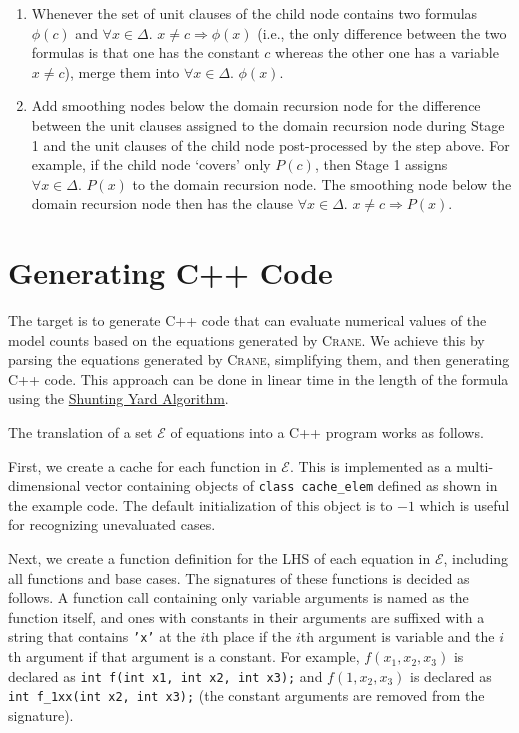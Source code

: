 \documentclass{article}
\theoremstyle{definition}
\begin{document}
\begin{enumerate}
  \item Whenever the set of unit clauses of the child node contains two formulas
        $\phi(c)$ and $\forall x \in \Delta\text{.
        } x \ne c \Rightarrow \phi(x)$ (i.e., the only difference between the
        two formulas is that one has the constant $c$ whereas the other one has
        a variable $x \ne c$), merge them into $\forall x \in \Delta\text{.
        }\phi(x)$.
  \item Add smoothing nodes below the domain recursion node for the difference
        between the unit clauses assigned to the domain recursion node during
        Stage 1 and the unit clauses of the child node post-processed by the
        step above. For example, if the child node `covers' only $P(c)$, then
        Stage 1 assigns $\forall x \in \Delta\text{. }P(x)$ to the domain
        recursion node. The smoothing node below the domain recursion node then
        has the clause $\forall x \in \Delta\text{. } x \ne c \Rightarrow P(x)$.
\end{enumerate}


\section{Generating C++ Code}\label{sec:cpp}

The target is to generate C++ code that can evaluate numerical values of the
model counts based on the equations generated by \textsc{Crane}. We achieve this
by parsing the equations generated by \textsc{Crane}, simplifying them, and then
generating C++ code. This approach can be done in linear time in the length of
the formula using
the
\href{https://en.wikipedia.org/wiki/Shunting_yard_algorithm#:~:text=In%20computer%20science%2C%20the%20shunting,abstract%20syntax%20tree%20(AST).}{Shunting
  Yard Algorithm}.

The translation of a set $\mathcal{E}$ of equations into a C++ program works as
follows.

First, we create a cache for each function in $\mathcal{E}$. This is implemented
as a multi-dimensional vector containing objects of \texttt{class cache\_elem}
defined as shown in the example code. The default initialization of this object
is to $-1$ which is useful for recognizing unevaluated cases.

Next, we create a function definition for the LHS of each equation in
$\mathcal{E}$, including all functions and base cases. The signatures of these
functions is decided as follows. A function call containing only variable
arguments is named as the function itself, and ones with constants in their
arguments are suffixed with a string that contains \texttt{'x'} at the $i$th
place if the $i$th argument is variable and the $i$th argument if that argument
is a constant. For example, $f(x_{1}, x_{2}, x_{3})$ is declared as \texttt{int
  f(int x1, int x2, int x3);} and $f(1, x_{2}, x_{3})$ is declared as
\texttt{int f\_1xx(int x2, int x3);} (the constant arguments are removed from
the signature).
\end{document}
